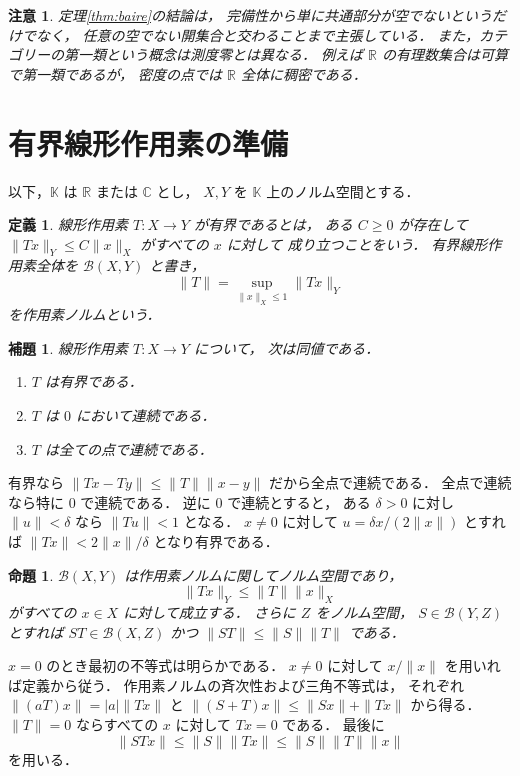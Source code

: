 \documentclass[a5paper,10pt,onecolumn]{jsarticle}
\makeatletter
\theoremstyle{mathnotetheorem}
\newtheorem{definition}[theorem]{定義}
\newtheorem{lemma}[theorem]{補題}
\newtheorem{proposition}[theorem]{命題}
\newtheorem{remark}[theorem]{注意}
\renewcommand{\proofname}{証明}
\renewenvironment{proof}[1][\proofname]{%
  \par\pushQED{\qed}\normalfont\topsep4\p@\@plus2\p@\relax
  \trivlist\item[\hskip\labelsep\bfseries #1]\ignorespaces
}{\popQED\endtrivlist\@endpefalse}
\makeatother
\begin{document}
\begin{remark}
定理\ref{thm:baire}の結論は，
完備性から単に共通部分が空でないというだけでなく，
任意の空でない開集合と交わることまで主張している．
また，カテゴリーの第一類という概念は測度零とは異なる．
例えば $\mathbb R$ の有理数集合は可算で第一類であるが，
密度の点では $\mathbb R$ 全体に稠密である．
\end{remark}

\section{有界線形作用素の準備}

以下，$\mathbb K$ は $\mathbb R$ または $\mathbb C$ とし，
$X,Y$ を $\mathbb K$ 上のノルム空間とする．

\begin{definition}
線形作用素 $T:X\to Y$ が\emph{有界}であるとは，
ある $C\ge0$ が存在して
$\|Tx\|_Y\le C\|x\|_X$ がすべての $x$ に対して
成り立つことをいう．
有界線形作用素全体を $\mathcal B(X,Y)$ と書き，
\[
 \|T\|=\sup_{\|x\|_X\le1}\|Tx\|_Y
\]
を作用素ノルムという．
\end{definition}

\begin{lemma}\label{lem:cont-bound}
線形作用素 $T:X\to Y$ について，
次は同値である．
\begin{enumerate}
\item $T$ は有界である．
\item $T$ は $0$ において連続である．
\item $T$ は全ての点で連続である．
\end{enumerate}
\end{lemma}
\begin{proof}
有界なら
$\|Tx-Ty\|\le\|T\|\|x-y\|$ だから全点で連続である．
全点で連続なら特に $0$ で連続である．
逆に $0$ で連続とすると，
ある $\delta>0$ に対し
$\|u\|<\delta$ なら $\|Tu\|<1$ となる．
$x\ne0$ に対して $u=\delta x/(2\|x\|)$ とすれば
$\|Tx\|<2\|x\|/\delta$ となり有界である．
\end{proof}

\begin{proposition}\label{prop:operator-norm}
$\mathcal B(X,Y)$ は作用素ノルムに関してノルム空間であり，
\[
 \|Tx\|_Y\le\|T\|\|x\|_X
\]
がすべての $x\in X$ に対して成立する．
さらに $Z$ をノルム空間，
$S\in\mathcal B(Y,Z)$ とすれば
$ST\in\mathcal B(X,Z)$ かつ
$\|ST\|\le\|S\|\|T\|$ である．
\end{proposition}
\begin{proof}
$x=0$ のとき最初の不等式は明らかである．
$x\ne0$ に対して $x/\|x\|$ を用いれば定義から従う．
作用素ノルムの斉次性および三角不等式は，
それぞれ $\|(aT)x\|=|a|\|Tx\|$ と
$\|(S+T)x\|\le\|Sx\|+\|Tx\|$ から得る．
$\|T\|=0$ ならすべての $x$ に対して $Tx=0$ である．
最後に
\[
 \|STx\|\le\|S\|\|Tx\|
 \le\|S\|\|T\|\|x\|
\]
を用いる．
\end{proof}
\end{document}
